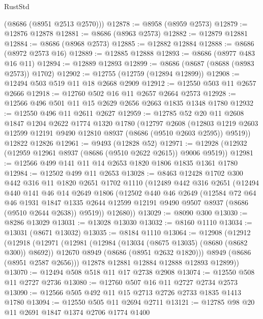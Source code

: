 \begin{lexlean}{RustStd}
\begin{coremodule}
      (@8686 (@8951 @2513 @2570)))
@12878 := @8958 (@8959 @2573)
@12879 := @12876 @12878
@12881 := @8686 (@8963 @2573)
@12882 := @12879 @12881
@12884 := @8686 (@8968 @2573)
@12885 := @12882 @12884
@12888 := @8686 (@8972 @2573 @16)
@12889 := @12885 @12888
@12893 := @8686 (@8977 @483 @16 @11)
@12894 := @12889 @12893
@12899 := @8686 (@8687 (@8688 (@8983 @2573)) @1702)
@12902 := @12755 (@12759 (@12894 @12899))
@12908 := @12494 @503 @519 @11 @18 @2668 @2909
@12912 := @12550 @503 @11 @2657 @2666
@12918 := @12760 @502 @16 @11 @2657 @2664 @2573
@12928 := @12566 @496 @501 @11 @15 @2629 @2656 @2663 @1835 @1348 @1780
@12932 := @12550 @496 @11 @2611 @2627
@12959 := @12785
    @52
    @20
    @11
    @2608
    @1847
    @1204
    @2622
    @1774
    @1320
    @1780
    (@12797
      @2608
      (@12803 @1219 @2603 @12599 @12191 @9490 @12810 @8937 (@8686 (@9510 @2603 @2595)) @9519))
    @12822
    @12826
@12961 := @9493 (@12828 @52)
@12971 := @12928 (@12932 (@12959 @12961 @8937 (@8686 (@9510 @2622 @2615)) @9006 @9519))
@12981 := @12566 @499 @141 @11 @14 @2653 @1820 @1806 @1835 @1361 @1780
@12984 := @12502 @499 @11 @2653
@13028 := @8463
    @12428
    @1702
    @300
    @442
    @316
    @11
    @1820
    @2651
    @1702
    @1110
    (@12489
      @442
      @316
      @2651
      (@12494
        @440
        @141
        @46
        @14
        @2649
        @1806
        (@12502
          @440
          @46
          @2649
          (@12584
            @72
            @64
            @46
            @1931
            @1847
            @1335
            @2644
            @12599
            @12191
            @9490
            @9507
            @8937
            (@8686 (@9510 @2644 @2638))
            @9519))
        @12680))
@13029 := @8090 @300
@13030 := @8286 @13029
@13031 := @13028 @13030
@13032 := @8160 @1110
@13034 := @13031 (@8671 @13032)
@13035 := @8184 @1110
@13064 := @12908
    (@12912
      (@12918
        (@12971
          (@12981
            (@12984 (@13034 (@8675 @13035) (@8680 (@8682 @300)) @8692))
            @12670
            @8949
            (@8686 (@8951 @2632 @1820)))
          @8949
          (@8686 (@8951 @2587 @2656)))
        @12878
        @12881
        @12884
        @12888
        @12893
        @12899))
@13070 := @12494 @508 @518 @11 @17 @2738 @2908
@13074 := @12550 @508 @11 @2727 @2736
@13080 := @12760 @507 @16 @11 @2727 @2734 @2573
@13090 := @12566 @505 @492 @11 @15 @2713 @2726 @2733 @1835 @1413 @1780
@13094 := @12550 @505 @11 @2694 @2711
@13121 := @12785
    @98
    @20
    @11
    @2691
    @1847
    @1374
    @2706
    @1774
    @1400

\end{coremodule}
\end{lexlean}
